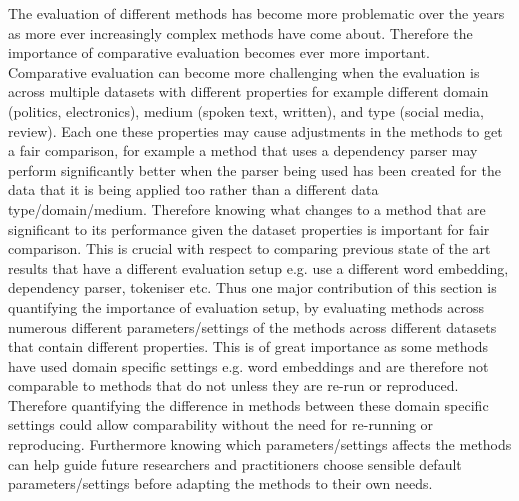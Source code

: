 The evaluation of different methods has become more problematic over the years as more ever increasingly complex methods have come about. Therefore the importance of comparative evaluation becomes ever more important. Comparative evaluation can become more challenging when the evaluation is across multiple datasets with different properties for example different domain (politics, electronics), medium (spoken text, written), and type (social media, review). Each one these properties may cause adjustments in the methods to get a fair comparison, for example a method that uses a dependency parser may perform significantly better when the parser being used has been created for the data that it is being applied too rather than a different data type/domain/medium. Therefore knowing what changes to a method that are significant to its performance given the dataset properties is important for fair comparison. This is crucial with respect to comparing previous state of the art results that have a different evaluation setup e.g. use a different word embedding, dependency parser, tokeniser etc. Thus one major contribution of this section is quantifying the importance of evaluation setup, by evaluating methods across numerous different parameters/settings of the methods across different datasets that contain different properties. This is of great importance as some methods have used domain specific settings e.g. word embeddings \citep{vo2015target,zhang2016gated,wang-etal-2017-tdparse} and are therefore not comparable to methods that do not \citep{chen-etal-2017-recurrent,li-etal-2018-transformation} unless they are re-run or reproduced. Therefore quantifying the difference in methods between these domain specific settings could allow comparability without the need for re-running or reproducing.
Furthermore knowing which parameters/settings affects the methods can help guide future researchers and practitioners choose sensible default parameters/settings before adapting the methods to their own needs.
\\
